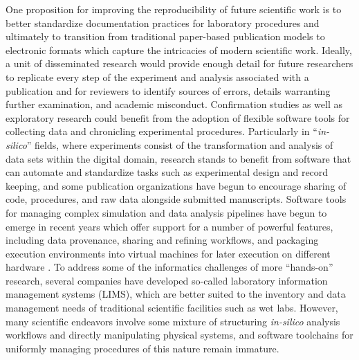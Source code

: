 One proposition for improving the
reproducibility of future scientific work is to better standardize
documentation practices for laboratory procedures
\cite{10.1371/journal.pmed.0020124} and ultimately to transition from
traditional paper-based publication models to electronic formats which
capture the intricacies of modern scientific work. Ideally, a unit of disseminated
research would provide enough detail for future researchers to replicate
every step of the experiment and analysis associated with a
publication and for reviewers to identify sources of errors, details
warranting further examination, and
academic misconduct. Confirmation studies as well as exploratory
research could benefit from the adoption of flexible
software tools for collecting data and chronicling experimental
procedures. Particularly in ``\textit{in-silico}'' fields, where
experiments consist of the transformation and analysis of data sets
within the digital domain, research stands to benefit from
software that can automate and standardize tasks such as
experimental design and record keeping, and some publication
organizations have begun to encourage sharing of code, procedures, and
raw data alongside submitted manuscripts.
Software tools for managing complex simulation and data analysis
pipelines have begun to emerge in recent years which offer support for a number of powerful features,
including data provenance, sharing and refining workflows, and
packaging execution environments into virtual machines for
later execution on different hardware \cite{VisTrails, Taverna}.
To address some of the informatics challenges of more ``hands-on''
research, several companies have developed
so-called laboratory information management systems (LIMS), which are
better suited to the inventory and data management needs of
traditional scientific facilities such as wet labs.
However, many scientific endeavors involve some mixture of
structuring \textit{in-silico} analysis workflows and directly
manipulating physical systems, and software toolchains for uniformly
managing procedures of this nature remain immature.

